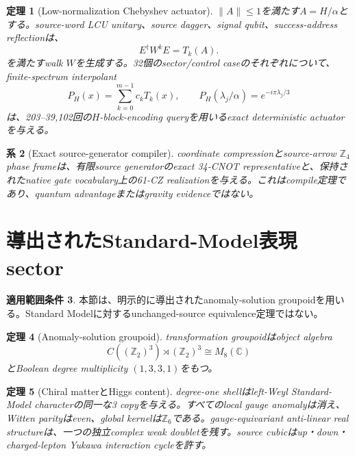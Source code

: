 \documentclass[11pt]{article}
\newtheorem{theorem}{定理}[section]
\newtheorem{corollary}[theorem]{系}
\theoremstyle{definition}
\newtheorem{scope}[theorem]{適用範囲条件}
\theoremstyle{remark}
\begin{document}
\begin{theorem}[Low-normalization Chebyshev actuator]
$\|A\|\le1$を満たす$A=H/\alpha$とする。source-word LCU unitary、source dagger、signal qubit、success-address reflectionは、
\begin{equation}
E^\dagger W^kE=T_k(A).
\label{eq:cheb}
\end{equation}
を満たすwalk $W$を生成する。32個のsector/control caseのそれぞれについて、finite-spectrum interpolant
\begin{equation}
P_H(x)=\sum_{k=0}^{m-1}c_kT_k(x),
\qquad
P_H(\lambda_j/\alpha)=e^{-i\pi\lambda_j/3}
\end{equation}
は、203--39,102回の$H$-block-encoding queryを用いるexact deterministic actuatorを与える\cite{childswiebe2012,lowchuang2017,gilyen2019}。
\end{theorem}

\begin{corollary}[Exact source-generator compiler]
coordinate compressionとsource-arrow $\mathbb Z_4$ phase frameは、有限source generatorのexact 34-CNOT representativeと、保持されたnative gate vocabulary上の61-CZ realizationを与える。これはcompile定理であり、quantum advantageまたはgravity evidenceではない。
\end{corollary}

\section{導出されたStandard-Model表現sector}

\begin{scope}
本節は、明示的に導出されたanomaly-solution groupoidを用いる。Standard Modelに対するunchanged-source equivalence定理ではない。
\end{scope}

\begin{theorem}[Anomaly-solution groupoid]
transformation groupoidはobject algebra
\begin{equation}
C((\mathbb Z_2)^3)\rtimes(\mathbb Z_2)^3\cong M_8(\mathbb C)
\label{eq:m8}
\end{equation}
とBoolean degree multiplicity $(1,3,3,1)$をもつ。
\end{theorem}

\begin{theorem}[Chiral matterとHiggs content]
degree-one shellはleft-Weyl Standard-Model characterの同一な3 copyを与える。すべてのlocal gauge anomalyは消え、Witten parityはeven、global kernelは$\mathbb Z_6$である。gauge-equivariant anti-linear real structureは、一つの独立complex weak doubletを残す。source cubicはup・down・charged-lepton Yukawa interaction cycleを許す。
\end{theorem}
\end{document}

